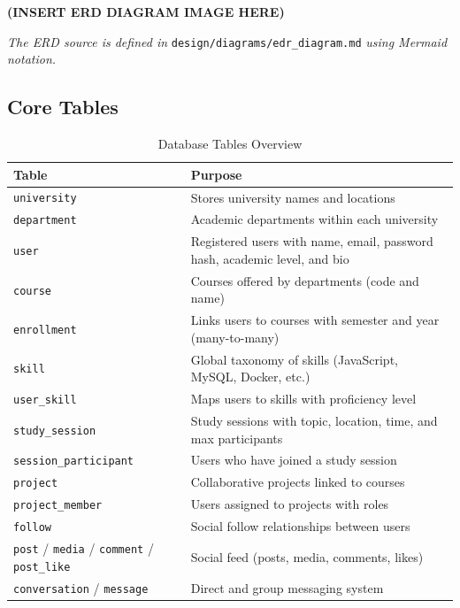 \documentclass[11pt,a4paper]{article}
\begin{document}

\textbf{(INSERT ERD DIAGRAM IMAGE HERE)}

\textit{The ERD source is defined in} \texttt{design/diagrams/edr\_diagram.md} \textit{using Mermaid notation.}

\subsection{Core Tables}

\begin{table}[H]
\centering
\begin{tabularx}{\textwidth}{lX}
    \toprule
    \textbf{Table} & \textbf{Purpose} \\
    \midrule
    \texttt{university}            & Stores university names and locations \\
    \texttt{department}            & Academic departments within each university \\
    \texttt{user}                  & Registered users with name, email, password hash, academic level, and bio \\
    \texttt{course}                & Courses offered by departments (code and name) \\
    \texttt{enrollment}            & Links users to courses with semester and year (many-to-many) \\
    \texttt{skill}                 & Global taxonomy of skills (JavaScript, MySQL, Docker, etc.) \\
    \texttt{user\_skill}           & Maps users to skills with proficiency level \\
    \texttt{study\_session}        & Study sessions with topic, location, time, and max participants \\
    \texttt{session\_participant}   & Users who have joined a study session \\
    \texttt{project}               & Collaborative projects linked to courses \\
    \texttt{project\_member}       & Users assigned to projects with roles \\
    \texttt{follow}                & Social follow relationships between users \\
    \texttt{post} / \texttt{media} / \texttt{comment} / \texttt{post\_like} & Social feed (posts, media, comments, likes) \\
    \texttt{conversation} / \texttt{message} & Direct and group messaging system \\
    \bottomrule
\end{tabularx}
\caption{Database Tables Overview}
\end{table}
\end{document}
